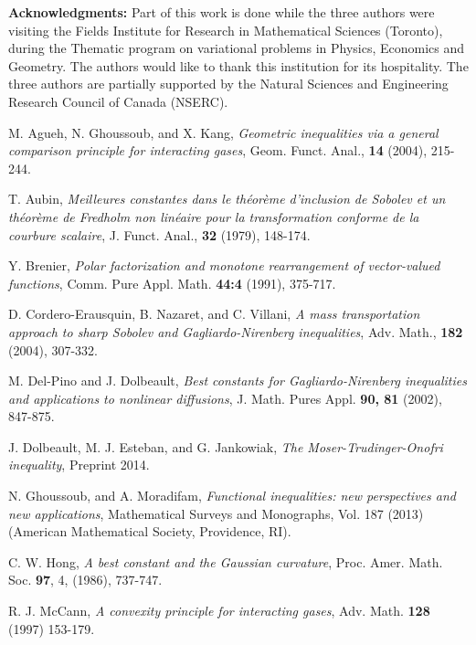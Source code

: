 \documentclass[10pt]{article}
\numberwithin{equation}{section}
\theoremstyle{plain}
\theoremstyle{definition}
\theoremstyle{remark}
\begin{document}


{\bf Acknowledgments:} Part of this work is done while the three authors were visiting the Fields Institute for Research in  Mathematical Sciences (Toronto), during the Thematic program on variational problems in Physics, Economics and Geometry. The authors would like to thank this institution for its hospitality. The three authors are partially supported by the Natural Sciences and Engineering Research Council of Canada (NSERC).


\begin{thebibliography}{999}

 M. Agueh, N. Ghoussoub, and X. Kang, {\em Geometric inequalities via a general comparison principle for interacting gases}, Geom. Funct. Anal., {\bf 14} (2004), 
215-244.

 T. Aubin, {\em Meilleures constantes dans le th\'eor\`eme d'inclusion de Sobolev et un  th\'eor\`eme de Fredholm non lin\'eaire pour la transformation conforme de la courbure scalaire}, J. Funct. Anal., {\bf 32} (1979), 148-174.

 Y. Brenier, {\em Polar factorization and monotone rearrangement of vector-valued functions}, Comm. Pure Appl. Math. {\bf 44:4} (1991), 375-717.

 D. Cordero-Erausquin, B. Nazaret, and C. Villani, {\em A mass transportation approach to sharp Sobolev and Gagliardo-Nirenberg inequalities}, Adv. Math., {\bf 182} 
(2004), 307-332. 

 M. Del-Pino and J. Dolbeault, {\em Best constants for Gagliardo-Nirenberg inequalities and applications to nonlinear diffusions}, J. Math. Pures Appl.  {\bf 90,  81} (2002), 847-875. 

 J. Dolbeault, M. J. Esteban, and G. Jankowiak, {\em The Moser-Trudinger-Onofri inequality}, Preprint 2014.

 N. Ghoussoub, and A. Moradifam, {\em Functional inequalities: new  perspectives and new applications}, Mathematical Surveys and Monographs, Vol. 187 (2013) (American Mathematical Society, Providence, RI).

 C. W. Hong, {\em A best constant and the Gaussian curvature}, Proc. Amer. Math. Soc. {\bf 97}, 4, (1986), 737-747. 

 R. J. McCann, {\em A convexity principle for interacting gases},  Adv. Math. {\bf 128} (1997) 153-179.


\end{thebibliography}
\end{document}
